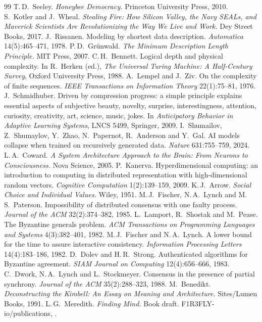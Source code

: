 \documentclass[11pt,a4paper]{article}
\begin{document}
\begin{thebibliography}{99}
 T.\,D.\ Seeley. \emph{Honeybee Democracy.} Princeton University Press, 2010.
 S.\ Kotler and J.\ Wheal. \emph{Stealing Fire: How Silicon Valley, the Navy
  SEALs, and Maverick Scientists Are Revolutionizing the Way We Live and Work.} Dey Street Books,
  2017.
 J.\ Rissanen. Modeling by shortest data description. \emph{Automatica}
  14(5):465--471, 1978.
 P.\,D.\ Grünwald. \emph{The Minimum Description Length Principle.} MIT Press,
  2007.
 C.\,H.\ Bennett. Logical depth and physical complexity. In R.\ Herken (ed.),
  \emph{The Universal Turing Machine: A Half-Century Survey}, Oxford University Press, 1988.
 A.\ Lempel and J.\ Ziv. On the complexity of finite sequences. \emph{IEEE
  Transactions on Information Theory} 22(1):75--81, 1976.
 J.\ Schmidhuber. Driven by compression progress: a simple principle explains
  essential aspects of subjective beauty, novelty, surprise, interestingness, attention, curiosity,
  creativity, art, science, music, jokes. In \emph{Anticipatory Behavior in Adaptive Learning
  Systems}, LNCS 5499, Springer, 2009.
 I.\ Shumailov, Z.\ Shumaylov, Y.\ Zhao, N.\ Papernot, R.\ Anderson and Y.\ Gal.
  AI models collapse when trained on recursively generated data. \emph{Nature} 631:755--759, 2024.
 L.\,A.\ Coward. \emph{A System Architecture Approach to the Brain: From Neurons to
  Consciousness.} Nova Science, 2005.
 P.\ Kanerva. Hyperdimensional computing: an introduction to computing in
  distributed representation with high-dimensional random vectors. \emph{Cognitive Computation}
  1(2):139--159, 2009.
 K.\,J.\ Arrow. \emph{Social Choice and Individual Values.} Wiley, 1951.
 M.\,J.\ Fischer, N.\,A.\ Lynch and M.\,S.\ Paterson. Impossibility of distributed
  consensus with one faulty process. \emph{Journal of the ACM} 32(2):374--382, 1985.
 L.\ Lamport, R.\ Shostak and M.\ Pease. The Byzantine generals problem.
  \emph{ACM Transactions on Programming Languages and Systems} 4(3):382--401, 1982.
 M.\,J.\ Fischer and N.\,A.\ Lynch. A lower bound for the time to assure
  interactive consistency. \emph{Information Processing Letters} 14(4):183--186, 1982.
 D.\ Dolev and H.\,R.\ Strong. Authenticated algorithms for Byzantine
  agreement. \emph{SIAM Journal on Computing} 12(4):656--666, 1983.
 C.\ Dwork, N.\,A.\ Lynch and L.\ Stockmeyer. Consensus in the presence of partial
  synchrony. \emph{Journal of the ACM} 35(2):288--323, 1988.
 M.\ Benedikt. \emph{Deconstructing the Kimbell: An Essay on Meaning and
  Architecture.} Sites/Lumen Books, 1991.
 L.\,G.\ Meredith. \emph{Finding Mind.} Book draft. F1R3FLY-io/publications,
  .
\end{thebibliography}
\endgroup
\end{document}
